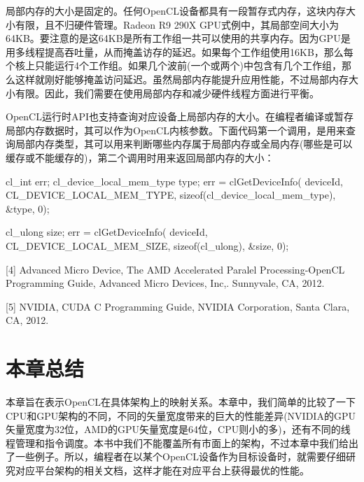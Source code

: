 
局部内存的大小是固定的。任何OpenCL设备都具有一段暂存式内存，这块内存大小有限，且不归硬件管理。Radeon R9 290X GPU式例中，其局部空间大小为64KB。要注意的是这64KB是所有工作组一共可以使用的共享内存。因为GPU是用多线程提高吞吐量，从而掩盖访存的延迟。如果每个工作组使用16KB，那么每个核上只能运行4个工作组。如果几个波前(一个或两个)中包含有几个工作组，那么这样就刚好能够掩盖访问延迟。虽然局部内存能提升应用性能，不过局部内存大小有限。因此，我们需要在使用局部内存和减少硬件线程方面进行平衡。

OpenCL运行时API也支持查询对应设备上局部内存的大小。在编程者编译或暂存局部内存数据时，其可以作为OpenCL内核参数。下面代码第一个调用，是用来查询局部内存类型，其可以用来判断哪些内存属于局部内存或全局内存(哪些是可以缓存或不能缓存的)，第二个调用时用来返回局部内存的大小：

\begin{codebox}[cpp]
cl_int err;
cl_device_local_mem_type type;
err = clGetDeviceInfo(
  deviceId,
  CL_DEVICE_LOCAL_MEM_TYPE,
  sizeof(cl_device_local_mem_type),
  &type,
  0);

cl_ulong size;
err = clGetDeviceInfo(
  deviceId,
  CL_DEVICE_LOCAL_MEM_SIZE,
  sizeof(cl_ulong),
  &size,
  0);
\end{codebox}

\myRefRule

\begin{myRefs}

[4] Advanced Micro Device, The AMD Accelerated Paralel Processing-OpenCL Programming Guide, Advanced Micro Devices, Inc,. Sunnyvale, CA, 2012.

[5] NVIDIA, CUDA C Programming Guide, NVIDIA Corporation, Santa Clara, CA, 2012.

\end{myRefs}



\section{本章总结}

本章旨在表示OpenCL在具体架构上的映射关系。本章中，我们简单的比较了一下CPU和GPU架构的不同，不同的矢量宽度带来的巨大的性能差异(NVIDIA的GPU矢量宽度为32位，AMD的GPU矢量宽度是64位，CPU则小的多)，还有不同的线程管理和指令调度。本书中我们不能覆盖所有市面上的架构，不过本章中我们给出了一些例子。所以，编程者在以某个OpenCL设备作为目标设备时，就需要仔细研究对应平台架构的相关文档，这样才能在对应平台上获得最优的性能。


